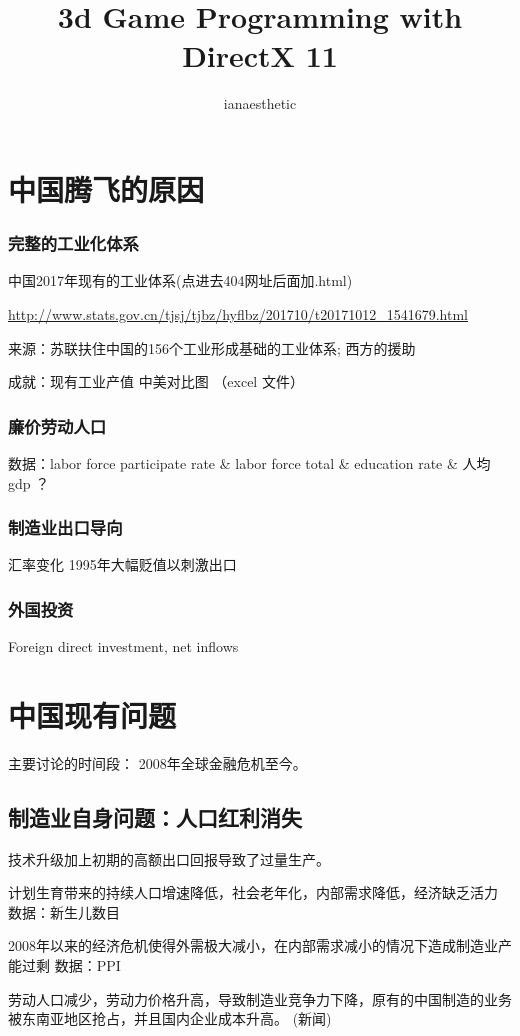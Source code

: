 \documentclass[10pt, a4paper]{article}
\author{ianaesthetic}
\title{3d Game Programming with DirectX 11}
\begin{document}
    \section{中国腾飞的原因}
        \subsubsection{完整的工业化体系}
            中国2017年现有的工业体系(点进去404网址后面加.html)

            \url{http://www.stats.gov.cn/tjsj/tjbz/hyflbz/201710/t20171012_1541679.html}
    
            来源：苏联扶住中国的156个工业形成基础的工业体系; 西方的援助
            
            成就：现有工业产值 中美对比图 （excel 文件）
        \subsubsection{廉价劳动人口}
            数据：labor force participate rate \& labor force total \& education rate \& 人均gdp ？ 

        \subsubsection{制造业出口导向}
            汇率变化 1995年大幅贬值以刺激出口
        \subsubsection{外国投资}
            Foreign direct investment, net inflows
\section{中国现有问题}    

    主要讨论的时间段： 2008年全球金融危机至今。

    \subsection{制造业自身问题：人口红利消失}

        技术升级加上初期的高额出口回报导致了过量生产。

        计划生育带来的持续人口增速降低，社会老年化，内部需求降低，经济缺乏活力
        数据：新生儿数目

        2008年以来的经济危机使得外需极大减小，在内部需求减小的情况下造成制造业产能过剩 
        数据：PPI

        劳动人口减少，劳动力价格升高，导致制造业竞争力下降，原有的中国制造的业务被东南亚地区抢占，并且国内企业成本升高。 (新闻)
\end{document}
